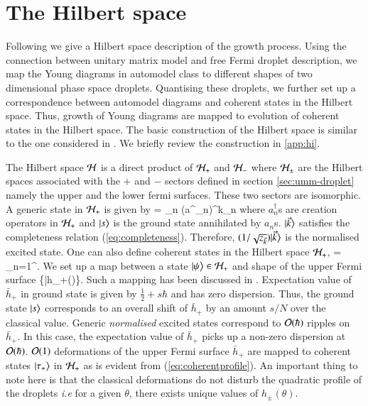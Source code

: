\documentclass[3p,12pt]{elsarticle}
\numberwithin{equation}{section}
\begin{document}
\section{The Hilbert space}
\label{sec:hilbertspace}

Following \cite{ Chattopadhyay:2020rle,Chattopadhyay:2019pkl} we give a Hilbert space description of the \qd growth process. Using the connection between unitary matrix model and free Fermi droplet description, we map the Young diagrams in automodel class to different shapes of two dimensional phase space droplets. Quantising these droplets, we further set up a correspondence between automodel diagrams and coherent states in the Hilbert space. Thus, growth of Young diagrams are mapped to evolution of coherent states in the Hilbert space. The basic construction of the Hilbert space is similar to the one considered in \cite{Chattopadhyay:2019pkl}. We briefly review the construction in \ref{app:hi}.

The Hilbert space $\mathcal{H}$ is a direct product of $\mathcal{H}_+$ and $\mathcal{H}_-$ where $\mathcal{H}_\pm$ are the Hilbert spaces associated with the $+$ and $-$ sectors defined in section \ref{sec:umm-droplet} namely the upper and the lower fermi surfaces. These two sectors are isomorphic. A generic state in $\mathcal{H}_+$ is given by
%
\ben
{} = \prod_{n} (a^\dagger_n)^{k_n}
\een
%
where $a^\dagger_n$s are creation operators in $\mathcal{H}_+$ and $|s\big>$ is the ground state annihilated by $a_n$s. $|\vec k\big>$ satisfies the completeness relation (\ref{eq:completeness}). Therefore, $(1/\sqrt{z_{\vec k}})|\vec k\big>$ is the normalised excited state. One can also define coherent states in the Hilbert space $\mathcal{H}_+$,
%
\ben
\ket{\tau_+} = \exp\lb \sum_{n=1}^\infty{}\rb {}. 
\een
%
We set up a map between a state $|\psi\big> \in \mathcal{H}_+$ and shape of the upper Fermi surface
%
\ben\label{eq:maping}
\ket{\psi} \ra \{\bra{\psi}\bar{h}_+(\theta)\ket{\psi}\}.
\een
%
Such a mapping has been discussed in \cite{Chattopadhyay:2020rle}. Expectation value of $\bar h_+$ in ground state is given by $\frac12 + s \hbar$ and has zero dispersion. Thus, the ground state $|s\big>$ corresponds to an overall shift of $\bar h_+$ by an amount $s/N$ over the classical value. Generic \emph{normalised} excited states correspond to ${\cal O}(\hbar)$ ripples on $\bar h_+$. In this case, the expectation value of $\bar{h}_+$ picks up a non-zero dispersion at ${\cal O}(\hbar)$. ${\cal O}(1)$ deformations of the upper Fermi surface $\bar{h}_+$ are mapped to coherent states $|\tau_+\big>$ in $\mathcal{H}_+$ as is evident from (\ref{eq:coherentprofile}). An important thing to note here is that the classical deformations do not disturb the quadratic profile of the droplets \emph{i.e} for a given $\theta$, there exists unique values of $h_\pm(\theta)$.
\end{document}
